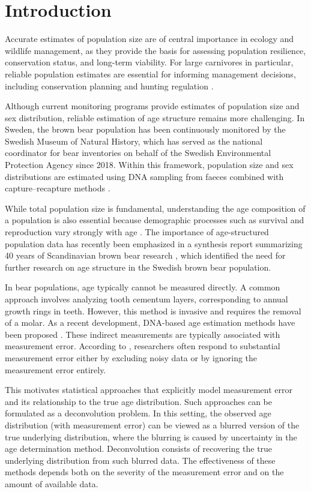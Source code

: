 \documentclass[11pt,a4paper]{article}
\begin{document}
\tableofcontents
\section{Introduction}
Accurate estimates of population size are of central importance in ecology and wildlife management, as they provide the basis for assessing population resilience, conservation status, and long-term viability. For large carnivores in particular, reliable population estimates are essential for informing management decisions, including conservation planning and hunting regulation \parencites{https://doi.org/10.2981/10-100}.

Although current monitoring programs provide estimates of population size and sex distribution, reliable estimation of age structure remains more challenging. In Sweden, the brown bear population has been continuously monitored by the Swedish Museum of Natural History, which has served as the national coordinator for bear inventories on behalf of the Swedish Environmental Protection Agency since 2018. Within this framework, population size and sex distributions are estimated using DNA sampling from faeces combined with capture--recapture methods \parencite{asbrink2025, asbrink2023_bjorninventering}.

While total population size is fundamental, understanding the age composition of a population is also essential because demographic processes such as survival and reproduction vary strongly with age \parencite{article}. The importance of age-structured population data has recently been emphasized in a synthesis report summarizing 40 years of Scandinavian brown bear research \parencite{naturvardsverket2025}, which identified the need for further research on age structure in the Swedish brown bear population.

In bear populations, age typically cannot be measured directly. A common approach involves analyzing tooth cementum layers, corresponding to annual growth rings in teeth. However, this method is invasive and requires the removal of a molar. As a recent development, DNA-based age estimation methods have been proposed \parencite{nakamura2023}. These indirect measurements are typically associated with measurement error. According to \cite{https://doi.org/10.1890/07-0369.1}, researchers often respond to substantial measurement error either by excluding noisy data or by ignoring the measurement error entirely.

This motivates statistical approaches that explicitly model measurement error and its relationship to the true age distribution. Such approaches can be formulated as a deconvolution problem. In this setting, the observed age distribution (with measurement error) can be viewed as a blurred version of the true underlying distribution, where the blurring is caused by uncertainty in the age determination method. Deconvolution consists of recovering the true underlying distribution from such blurred data. The effectiveness of these methods depends both on the severity of the measurement error and on the amount of available data.
\end{document}
